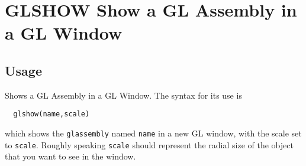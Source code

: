 \section{GLSHOW Show a GL Assembly in a GL Window}

\subsection{Usage}

Shows a GL Assembly in a GL Window.  The syntax for its
use is
\begin{verbatim}
  glshow(name,scale)
\end{verbatim}
which shows the \verb|glassembly| named \verb|name| in a new GL
window, with the scale set to \verb|scale|.  Roughly speaking
\verb|scale| should represent the radial size of the object
that you want to see in the window.
